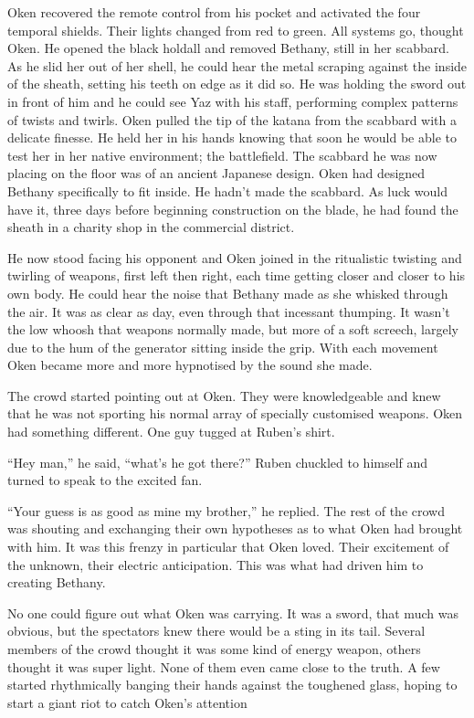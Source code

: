 Oken recovered the remote control from his pocket and activated the four temporal shields.  Their lights changed from red to green.  All systems go, thought Oken.  He opened the black holdall and removed Bethany, still in her scabbard.  As he slid her out of her shell, he could hear the metal scraping against the inside of the sheath, setting his teeth on edge as it did so.  He was holding the sword out in front of him and he could see Yaz with his staff, performing complex patterns of twists and twirls.  Oken pulled the tip of the katana from the scabbard with a delicate finesse.  He held her in his hands knowing that soon he would be able to test her in her native environment; the battlefield.  The scabbard he was now placing on the floor was of an ancient Japanese design.  Oken had designed Bethany specifically to fit inside.  He hadn't made the scabbard.  As luck would have it, three days before beginning construction on the blade, he had found the sheath in a charity shop in the commercial district.  

He now stood facing his opponent and Oken joined in the ritualistic twisting and twirling of weapons, first left then right, each time getting closer and closer to his own body.  He could hear the noise that Bethany made as she whisked through the air.  It was as clear as day, even through that incessant thumping.  It wasn't the low whoosh that weapons normally made, but more of a soft screech, largely due to the hum of the generator sitting inside the grip.  With each movement Oken became more and more hypnotised by the sound she made.

The crowd started pointing out at Oken.  They were knowledgeable and knew that he was not sporting his normal array of specially customised weapons.  Oken had something different.  One guy tugged at Ruben's shirt.

``Hey man,'' he said, ``what's he got there?''  Ruben chuckled to himself and turned to speak to the excited fan.

``Your guess is as good as mine my brother,'' he replied.  The rest of the crowd was shouting and exchanging their own hypotheses as to what Oken had brought with him.  It was this frenzy in particular that Oken loved.  Their excitement of the unknown, their electric anticipation.  This was what had driven him to creating Bethany.  

No one could figure out what Oken was carrying.  It was a sword, that much was obvious, but the spectators knew there would be a sting in its tail.  Several members of the crowd thought it was some kind of energy weapon, others thought it was super light.  None of them even came close to the truth.  A few started rhythmically banging their hands against the toughened glass, hoping to start a giant riot to catch Oken's attention

